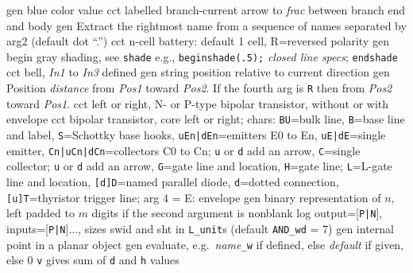 %
  {gen}
  {blue color value}
  {cct}
  {labelled branch-current arrow to {\sl frac} between branch end and body
    }
  {gen}
  {Extract the rightmost name from a sequence of names separated by arg2
   (default dot ``.'')}
  {cct}
  {n-cell battery: default 1 cell,
  R=reversed polarity}
  {gen}
  {begin gray shading, see {\tt shade}
   e.g., {\tt beginshade(.5);} {\sl closed line specs}; {\tt endshade}}
  {cct}
  {bell, {\sl In1} to {\sl In3} defined
   }
  {gen}
  {string position relative to current direction}
  {gen}
  {Position {\sl distance} from {\sl Pos1} toward {\sl Pos2}.  If
   the fourth arg is {\tt R} then from {\sl Pos2} toward {\sl Pos1}.}
  {cct}
  {left or right, N- or P-type bipolar transistor, without or with envelope 
    }
  {cct}
  { bipolar transistor, core left or right; chars:
   {\tt BU}=bulk line,
   {\tt B}=base line and label,
   {\tt S}=Schottky base hooks,
   {\tt uEn|dEn}=emitters E0 to En,
   {\tt uE|dE}=single emitter,
   {\tt Cn|uCn|dCn}=collectors C0 to Cn; {\tt u} or {\tt d} add an arrow,
   {\tt C}=single collector; {\tt u} or {\tt d} add an arrow,
   {\tt G}=gate line and location,
   {\tt H}=gate line; {\tt L}=L-gate line and location,
   {\tt [d]D}=named parallel diode,
   {\tt d}=dotted connection,
   {\tt [u]T}=thyristor trigger line;
   arg 4 = E: envelope
    }
  {gen}
  {binary representation of $n,$ left padded to $m$ digits if the second
   argument is nonblank}
  {log}
  {output=[{\tt P|N}], inputs=[{\tt P|N}]$\ldots$, sizes swid and sht
  in {\tt L\_unit}s (default {\tt AND\_wd} = 7)
    }
  {gen}
  {internal point in a planar object}
  {gen}
  {evaluate, e.g.\ {\sl name}{\tt \_w} if defined, else {\sl default\/}
   if given, else 0 {\tt v} gives sum of {\tt d} and {\tt h} values
     }
